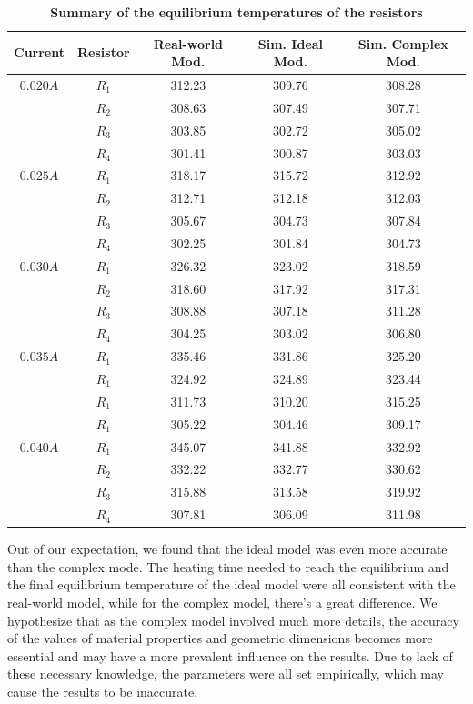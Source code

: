 \documentclass[10pt,a4paper,twocolumn,twoside,UTF8]{article}
\begin{document}
	\begin{table}[htbp]
	\centering
	\caption{\textbf{Summary of the equilibrium temperatures of the resistors}}
	\label{tab.1}
		\begin{tabular}{ccccc}
			\toprule
			Current & Resistor & Real-world Mod. & Sim. Ideal Mod. & Sim. Complex Mod. \\
			\midrule
			$0.020A$ & $R_1$ & 312.23 & 309.76 & 308.28 \\
			~ & $R_2$ & 308.63 & 307.49 & 307.71 \\
			~ & $R_3$ & 303.85 & 302.72 & 305.02 \\
			~ & $R_4$ & 301.41 & 300.87 & 303.03 \\
			$0.025A$ & $R_1$ & 318.17 & 315.72 & 312.92 \\
			~ & $R_2$ & 312.71 & 312.18 & 312.03 \\
			~ & $R_3$ & 305.67 & 304.73 & 307.84 \\
			~ & $R_4$ & 302.25 & 301.84 & 304.73 \\
			$0.030A$ & $R_1$ & 326.32 & 323.02 & 318.59 \\
			~ & $R_2$ & 318.60 & 317.92 & 317.31 \\
			~ & $R_3$ & 308.88 & 307.18 & 311.28 \\
			~ & $R_4$ & 304.25 & 303.02 & 306.80 \\
			$0.035A$ & $R_1$ & 335.46 & 331.86 & 325.20 \\
			~ & $R_1$ & 324.92 & 324.89 & 323.44 \\
			~ & $R_1$ & 311.73 & 310.20 & 315.25 \\
			~ & $R_1$ & 305.22 & 304.46 & 309.17 \\
			$0.040A$ & $R_1$ & 345.07 & 341.88 & 332.92 \\
			~ & $R_2$ & 332.22 & 332.77 & 330.62 \\
			~ & $R_3$ & 315.88 & 313.58 & 319.92 \\
			~ & $R_4$ & 307.81 & 306.09 & 311.98 \\
			\bottomrule
		\end{tabular}
	\end{table}

	Out of our expectation, we found that the ideal model was even more accurate than the complex mode. 
	The heating time needed to reach the equilibrium and the final equilibrium temperature of the ideal model were all consistent with the real-world model, 
	while for the complex model, there's a great difference.
	We hypothesize that as the complex model involved much more details, the accuracy of the values of material properties and geometric dimensions becomes more essential and may have a more prevalent influence on the results.
	Due to lack of these necessary knowledge, the parameters were all set empirically, which may cause the results to be inaccurate.
\end{document}
